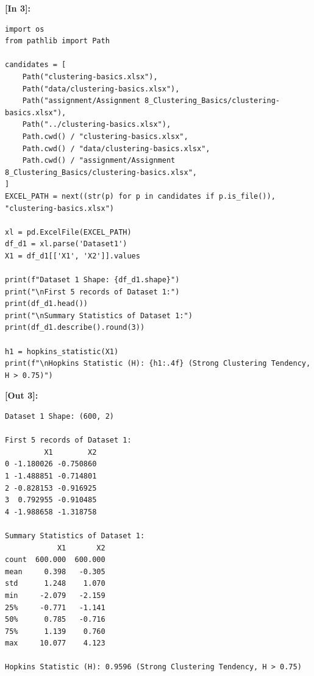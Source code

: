 \vspace{0.4em}
\noindent\textbf{\small [In 3]:}
\begin{lstlisting}[style=pycode]
import os
from pathlib import Path

candidates = [
    Path("clustering-basics.xlsx"),
    Path("data/clustering-basics.xlsx"),
    Path("assignment/Assignment 8_Clustering_Basics/clustering-basics.xlsx"),
    Path("../clustering-basics.xlsx"),
    Path.cwd() / "clustering-basics.xlsx",
    Path.cwd() / "data/clustering-basics.xlsx",
    Path.cwd() / "assignment/Assignment 8_Clustering_Basics/clustering-basics.xlsx",
]
EXCEL_PATH = next((str(p) for p in candidates if p.is_file()), "clustering-basics.xlsx")

xl = pd.ExcelFile(EXCEL_PATH)
df_d1 = xl.parse('Dataset1')
X1 = df_d1[['X1', 'X2']].values

print(f"Dataset 1 Shape: {df_d1.shape}")
print("\nFirst 5 records of Dataset 1:")
print(df_d1.head())
print("\nSummary Statistics of Dataset 1:")
print(df_d1.describe().round(3))

h1 = hopkins_statistic(X1)
print(f"\nHopkins Statistic (H): {h1:.4f} (Strong Clustering Tendency, H > 0.75)")
\end{lstlisting}
\noindent\textbf{\small [Out 3]:}
\begin{lstlisting}[style=output]
Dataset 1 Shape: (600, 2)

First 5 records of Dataset 1:
         X1        X2
0 -1.180026 -0.750860
1 -1.488851 -0.714801
2 -0.828153 -0.916925
3  0.792955 -0.910485
4 -1.988658 -1.318758

Summary Statistics of Dataset 1:
            X1       X2
count  600.000  600.000
mean     0.398   -0.305
std      1.248    1.070
min     -2.079   -2.159
25%     -0.771   -1.141
50%      0.785   -0.716
75%      1.139    0.760
max     10.077    4.123

Hopkins Statistic (H): 0.9596 (Strong Clustering Tendency, H > 0.75)
\end{lstlisting}

